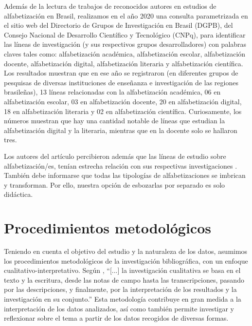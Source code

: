 \documentclass{textolivre}
\begin{document}
Además de la lectura de trabajos de reconocidos autores en estudios de alfabetización en Brasil, realizamos en el año 2020 una consulta parametrizada en el sitio web del Directorio de Grupos de Investigación en Brasil (DGPB), del Consejo Nacional de Desarrollo Científico y Tecnológico (CNPq), para identificar las líneas de investigación (y sus respectivos grupos desarrolladores) con palabras claves tales como: alfabetización académica, alfabetización escolar, alfabetización docente, alfabetización digital, alfabetización literaria y alfabetización científica. Los resultados muestran que en ese año se registraron (en diferentes grupos de pesquisas de diversas instituciones de enseñanza e investigación de las regiones brasileñas), 13 líneas relacionadas con la alfabetización académica, 06 en alfabetización escolar, 03 en alfabetización docente, 20 en alfabetización digital, 18 en alfabetización literaria y 02 en alfabetización científica. Curiosamente, los números muestran que hay una cantidad notable de líneas que estudian la alfabetización digital y la literaria, mientras que en la docente solo se hallaron tres.

Los autores del artículo percibieron además que las líneas de estudio sobre alfabetización/es, tenían estrecha relación con sus respectivas investigaciones \cite{goncalves_nas_2011, goncalves_interacao_2013, silva_pedagogia_2018, silva_formacao_2019, silva_plano_2020, santos_letramento_2020}. También debe informarse que todas las tipologías de alfabetizaciones se imbrican y transforman. Por ello, nuestra opción de esbozarlas por separado es solo didáctica.

\section{Procedimientos metodológicos}\label{sec-metodologia}
Teniendo en cuenta el objetivo del estudio y la naturaleza de los datos, asumimos los procedimientos metodológicos de la investigación bibliográfica, con un enfoque cualitativo-interpretativo. Según \textcite[p. 9]{flick_introduco_2009}, “[...] la investigación cualitativa se basa en el texto y la escritura, desde las notas de campo hasta las transcripciones, pasando por las descripciones, y finalmente, por la interpretación de los resultados y la investigación en su conjunto.” Esta metodología contribuye en gran medida a la interpretación de los datos analizados, así como también permite investigar y reflexionar sobre el tema a partir de los datos recogidos de diversas formas.
\end{document}
